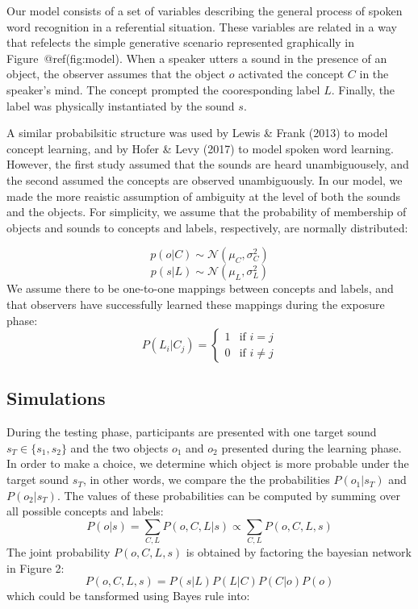 \documentclass[10pt, letterpaper]{article}
\begin{document}
Our model consists of a set of variables describing the general process
of spoken word recognition in a referential situation. These variables
are related in a way that refelects the simple generative scenario
represented graphically in Figure~@ref(fig:model). When a speaker utters
a sound in the presence of an object, the observer assumes that the
object \(o\) activated the concept \(C\) in the speaker's mind. The
concept prompted the cooresponding label \(L\). Finally, the label was
physically instantiated by the sound \(s\).

A similar probabilsitic structure was used by Lewis \& Frank (2013) to
model concept learning, and by Hofer \& Levy (2017) to model spoken word
learning. However, the first study assumed that the sounds are heard
unambiguousely, and the second assumed the concepts are observed
unambiguously. In our model, we made the more reaistic assumption of
ambiguity at the level of both the sounds and the objects. For
simplicity, we assume that the probability of membership of objects and
sounds to concepts and labels, respectively, are normally distributed:

\[ p(o | C) \sim  \mathcal{N}(\mu_C, \sigma^2_C) \]
\[ p(s| L) \sim  \mathcal{N}(\mu_L, \sigma^2_L) \] We assume there to be
one-to-one mappings between concepts and labels, and that observers have
successfully learned these mappings during the exposure phase: \[
P(L_i|C_j) = 
\begin{cases}
  1 & \text{if  }  i=j \\  
  0  & \text{if  }  i\neq j 
\end{cases}
\]

\subsection{Simulations}\label{simulations}

During the testing phase, participants are presented with one target
sound \(s_T \in\{s_1, s_2\}\) and the two objects \(o_1\) and \(o_2\)
presented during the learning phase. In order to make a choice, we
determine which object is more probable under the target sound \(s_T\),
in other words, we compare the the probabilities \(P(o_1|s_T)\) and
\(P(o_2|s_T)\). The values of these probabilities can be computed by
summing over all possible concepts and labels:
\[P(o|s)=\sum_{C,L} P(o, C, L| s) \propto \sum_{C,L} P(o, C, L, s) \]
The joint probability \(P(o, C, L, s)\) is obtained by factoring the
bayesian network in Figure 2: \[P(o,C,L,s) = P(s|L)P(L|C)P(C|o)P(o) \]
which could be tansformed using Bayes rule into:
\end{document}
